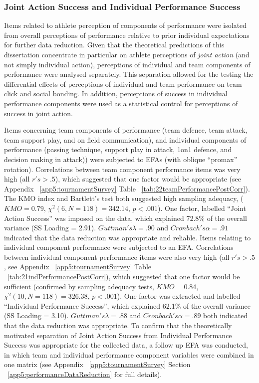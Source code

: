 \subsubsection{Joint Action Success and Individual Performance Success}
Items related to athlete perception of components of performance were isolated from overall perceptions of performance relative to prior individual expectations for further data reduction. Given that the theoretical predictions of this dissertation concentrate in particular on athlete perceptions of \textit{joint action} (and not simply individual action), perceptions of individual and team components of performance were analysed separately. This separation allowed for the testing the differential effects of perceptions of individual and team performance on team click and social bonding. In addition, perceptions of success in individual performance components were used as a statistical control for perceptions of success in joint action.

Items concerning team components of performance (team defence, team attack, team support play, and on field communication), and individual components of performance (passing technique, support play in attack, 1on1 defence, and decision making in attack)) were subjected to EFAs (with oblique ``promax'' rotation).  Correlations between team component performance items was very high (all $r's > .5$), which suggested that one factor would be appropriate (see Appendix ~\ref{app5:tournamentSurvey} Table ~\ref{tab:22teamPerformancePostCorr}). The KMO index and Bartlett's test both suggested high sampling adequacy, ($KMO = 0.79$, $\chi^2(6, N = 118) = 342.14$, $p < .001$).  One factor, labelled ``Joint Action Success'' was imposed on the data, which explained 72.8\% of the overall variance (SS Loading = 2.91). $Guttman's \lambda =.90$ and $Cronbach's\alpha = .91$ indicated that the data reduction was appropriate and reliable. Items relating to individual component performance  were subjected to an EFA.  Correlations between individual component performance items were also very high (all $r's > .5$, see Appendix ~\ref{app5:tournamentSurvey} Table ~\ref{tab:21indPerformancePostCorr}), which suggested that one factor would be sufficient (confirmed by sampling adequacy tests, $KMO =  0.84$, $\chi^2(10, N = 118) =  326.38$, $p < .001$).  One factor was extracted and labelled ``Individual Performance Success'', which explained 62.1\% of the overall variance (SS Loading = 3.10).
$Guttman's\lambda =.88$ and $Cronbach's \alpha = .89$ both indicated that the data reduction was appropriate.  To confirm that the theoretically motivated separation of Joint Action Success from Individual Performance Success was appropriate for the collected data, a follow up EFA was conducted, in which team and individual performance component variables were combined in one matrix (see Appendix ~\ref{app5:tournamentSurvey} Section ~\ref{app5:performanceDataReduction} for full details).


